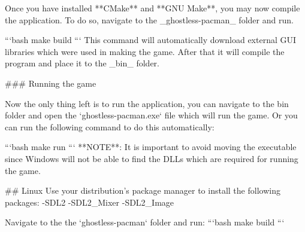 Once you have installed **CMake** and **GNU Make**, you may now compile the application. To do so, navigate to the _ghostless-pacman_ folder  and run.
 
```bash
make build
```
This command will automatically download external GUI libraries which were used in making the game. After that it will compile the program and place it to the _bin_ folder.

### Running the game

Now the only thing left is to run the application, you can navigate to the bin folder and open the `ghostless-pacman.exe` file which will run the game. Or you can run the following command to do this automatically:

```bash
make run
```
**NOTE**: It is important to avoid moving the executable since Windows will not be able to find the DLLs which are required for running the game.


## Linux
Use your distribution’s package manager to install the following packages:
-SDL2
-SDL2_Mixer
-SDL2_Image

Navigate to the the `ghostless-pacman` folder and run:
```bash
make build
```